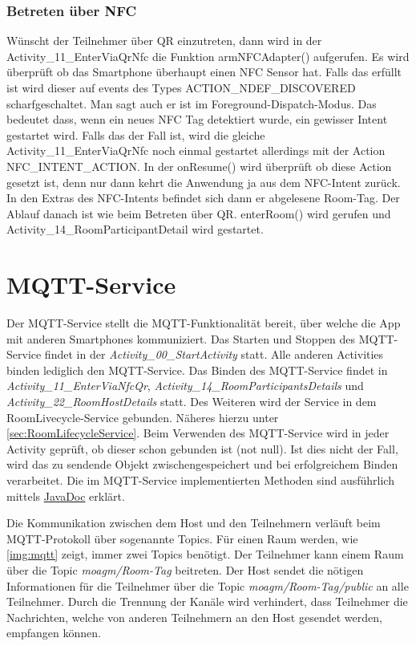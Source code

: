 \subsubsection*{Betreten über NFC}
\label{subsec: Betreten über NFC}
Wünscht der Teilnehmer über QR einzutreten, dann wird in der Activity\_11\_EnterViaQrNfc die Funktion armNFCAdapter() aufgerufen. Es wird überprüft ob das Smartphone überhaupt einen NFC Sensor hat.
Falls das erfüllt ist wird dieser auf events des Types ACTION\_NDEF\_DISCOVERED scharfgeschaltet. 
Man sagt auch er ist im Foreground-Dispatch-Modus.
Das bedeutet dass, wenn ein neues NFC Tag detektiert wurde, ein gewisser Intent gestartet wird. 
Falls das der Fall ist, wird die gleiche Activity\_11\_EnterViaQrNfc noch einmal gestartet allerdings mit der Action NFC\_INTENT\_ACTION. 
In der onResume() wird überprüft ob diese Action gesetzt ist, denn nur dann kehrt die Anwendung ja aus dem NFC-Intent zurück. 
In den Extras des NFC-Intents befindet sich dann er abgelesene Room-Tag. Der Ablauf danach ist wie beim Betreten über QR. enterRoom() wird gerufen und Activity\_14\_RoomParticipantDetail wird gestartet.
\section{MQTT-Service}
Der MQTT-Service stellt die MQTT-Funktionalität bereit, über welche die App mit anderen Smartphones kommuniziert.
Das Starten und Stoppen des MQTT-Service findet in der \textit{Activity\_00\_StartActivity} statt. Alle anderen Activities binden lediglich den MQTT-Service. Das Binden des MQTT-Service findet in  \textit{Activity\_11\_EnterViaNfcQr}, \textit{Activity\_14\_RoomParticipantsDetails} und \textit{Activity\_22\_RoomHostDetails} statt. Des Weiteren wird der Service in dem RoomLivecycle-Service gebunden. Näheres hierzu unter \cref{sec:RoomLifecycleService}.  Beim Verwenden des MQTT-Service wird in jeder Activity geprüft, ob dieser schon gebunden ist (not null). Ist dies nicht der Fall, wird das zu sendende Objekt zwischengespeichert und bei erfolgreichem Binden verarbeitet. 
Die im MQTT-Service implementierten Methoden sind ausführlich mittels \href{https://scm.inftech.hs-mannheim.de/gogs/moa/20moagm/src/dev/Doku/javadoc}{JavaDoc} erklärt. 

Die Kommunikation zwischen dem Host und den Teilnehmern verläuft beim MQTT-Protokoll über sogenannte Topics. Für einen Raum werden, wie \cref{img:mqtt} zeigt, immer zwei Topics benötigt. Der Teilnehmer kann einem Raum über die Topic \textit{moagm/Room-Tag} beitreten. Der Host sendet die nötigen Informationen für die Teilnehmer über die Topic \textit{moagm/Room-Tag/public} an alle Teilnehmer. Durch die Trennung der Kanäle wird verhindert, dass Teilnehmer die Nachrichten, welche von anderen Teilnehmern an den Host gesendet werden, empfangen können.


